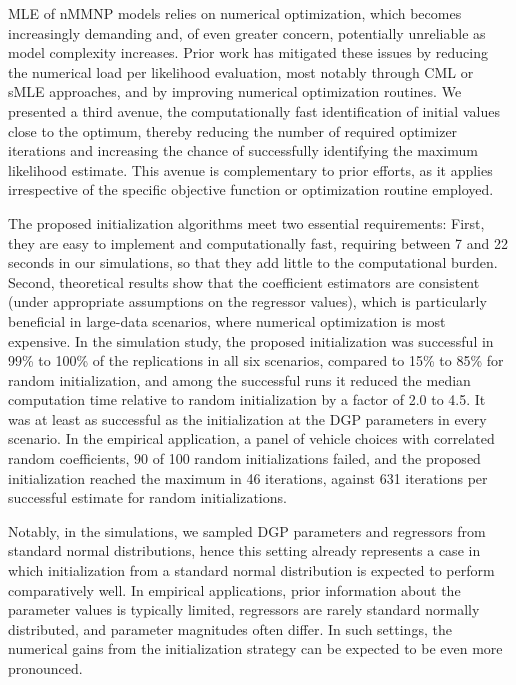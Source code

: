 \documentclass[preprint,12pt,authoryear]{elsarticle}
\begin{document}
MLE of nMMNP models relies on numerical optimization, which becomes increasingly demanding and, of even greater concern, potentially unreliable as model complexity increases. Prior work has mitigated these issues by reducing the numerical load per likelihood evaluation, most notably through CML or sMLE approaches, and by improving numerical optimization routines. We presented a third avenue, the computationally fast identification of initial values close to the optimum, thereby reducing the number of required optimizer iterations and increasing the chance of successfully identifying the maximum likelihood estimate. This avenue is complementary to prior efforts, as it applies irrespective of the specific objective function or optimization routine employed.

The proposed initialization algorithms meet two essential requirements: First, they are easy to implement and computationally fast, requiring between 7 and 22 seconds in our simulations, so that they add little to the computational burden. Second, theoretical results show that the coefficient estimators are consistent (under appropriate assumptions on the regressor values), which is particularly beneficial in large-data scenarios, where numerical optimization is most expensive. In the simulation study, the proposed initialization was successful in 99\% to 100\% of the replications in all six scenarios, compared to 15\% to 85\% for random initialization, and among the successful runs it reduced the median computation time relative to random initialization by a factor of 2.0 to 4.5. It was at least as successful as the initialization at the DGP parameters in every scenario. In the empirical application, a panel of vehicle choices with correlated random coefficients, 90 of 100 random initializations failed, and the proposed initialization reached the maximum in 46 iterations, against 631 iterations per successful estimate for random initializations.

Notably, in the simulations, we sampled DGP parameters and regressors from standard normal distributions, hence this setting already represents a case in which initialization from a standard normal distribution is expected to perform comparatively well. In empirical applications, prior information about the parameter values is typically limited, regressors are rarely standard normally distributed, and parameter magnitudes often differ. In such settings, the numerical gains from the initialization strategy can be expected to be even more pronounced.
\end{document}
